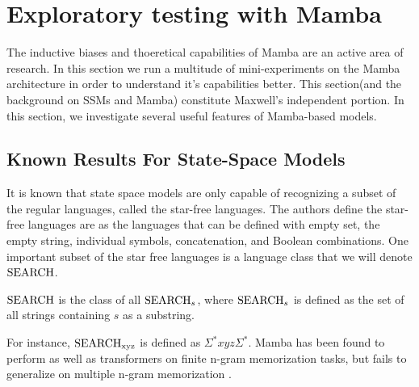 \section{Exploratory testing with Mamba}
The inductive biases and thoeretical capabilities of Mamba are an active area of
research. In this section we run a multitude of mini-experiments on the Mamba
architecture in order to understand it's capabilities better.
This section(and the background on SSMs and Mamba) constitute Maxwell's
independent portion. In this section, we investigate several useful features of
Mamba-based models.

\subsection{Known Results For State-Space Models}
It is known that state space models are only capable of recognizing a subset of
the regular languages\cite{ssmformal}, called the star-free languages.
The authors define the star-free languages are as the languages that can be
defined with empty set, the empty string, individual symbols, concatenation, and
Boolean combinations.
One important subset of the star free languages is a language class that we will
denote ${\text{SEARCH}}$.
\begin{definition}
    ${\text{SEARCH}}$ is the class of all ${\text{SEARCH}}_{s}$, where ${\text{SEARCH}}_{s}$ is defined
    as the set of all strings containing $s$ as a substring.
\end{definition}
For instance, ${\text{SEARCH}}_{\text{xyz}}$ is defined as $\Sigma^{*}xyz\Sigma^{*}$.
Mamba has been found to perform as well as transformers on finite n-gram
memorization tasks, but fails to generalize on multiple n-gram memorization
\cite{mambangram}.

